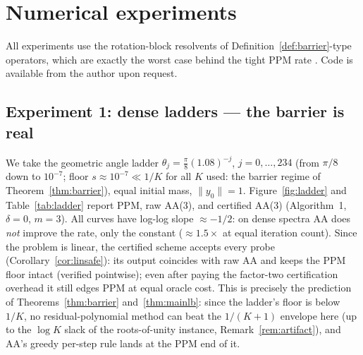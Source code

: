 \documentclass[11pt]{article}
\theoremstyle{definition}
\theoremstyle{remark}
\newcommand{\norm}[1]{\| #1 \|}
\begin{document}
\section{Numerical experiments}\label{sec:numerics}

All experiments use the rotation-block resolvents of
Definition~\ref{def:barrier}-type operators, which are exactly the worst
case behind the tight PPM rate \cite{guyang2020tight,bravo2019sharp}. Code
is available from the author upon request.

\subsection{Experiment 1: dense ladders --- the barrier is real}\label{sec:exp1}

We take the geometric angle ladder $\theta_j=\frac{\pi}8(1.08)^{-j}$,
$j=0,\dots,234$ (from $\pi/8$ down to $10^{-7}$; floor $s\approx10^{-7}\ll
1/K$ for all $K$ used: the barrier regime of Theorem~\ref{thm:barrier}),
equal initial mass, $\norm{y_0}=1$. Figure~\ref{fig:ladder} and
Table~\ref{tab:ladder} report PPM, raw AA(3), and certified AA(3)
(Algorithm~1, $\delta=0$, $m=3$). All curves have log-log slope
$\approx-1/2$: on dense spectra AA does \emph{not} improve the rate, only
the constant ($\approx1.5\times$ at equal iteration count). Since the
problem is linear, the certified scheme accepts every probe
(Corollary~\ref{cor:linsafe}): its output coincides with raw AA and keeps
the PPM floor intact (verified pointwise); even after paying the factor-two
certification overhead it still edges PPM at equal oracle cost. This is
precisely the prediction of Theorems~\ref{thm:barrier}
and~\ref{thm:mainlb}: since the ladder's floor is below $1/K$, no
residual-polynomial method can beat the $1/(K+1)$ envelope here (up to the
$\log K$ slack of the roots-of-unity instance,
Remark~\ref{rem:artifact}), and AA's greedy per-step rule lands at the PPM
end of it.
\end{document}
